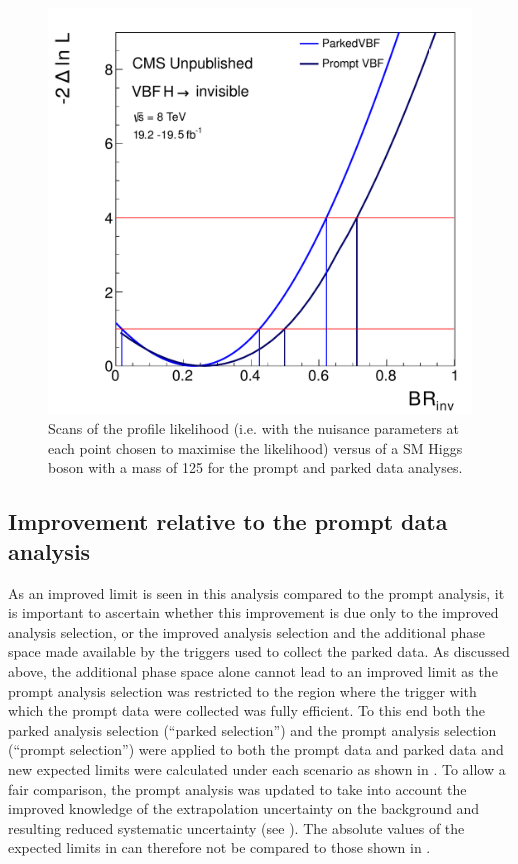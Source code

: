 \begin{figure}
  \includegraphics[width=\largefigwidth]{plots/parked/promptparkedscan.pdf}
  \caption{Scans of the profile likelihood (i.e. with the nuisance parameters at each point chosen to maximise the likelihood) versus \BRinv of a \ac{SM} Higgs boson with a mass of 125 \GeV for the prompt and parked data analyses.}
  \label{fig:parkedlikelihood}
\end{figure}

\subsection{Improvement relative to the prompt data analysis}
As an improved limit is seen in this analysis compared to the prompt analysis, it is important to ascertain whether this improvement is due only to the improved analysis selection, or the improved analysis selection and the additional phase space made available by the triggers used to collect the parked data. As discussed above, the additional phase space alone cannot lead to an improved limit as the prompt analysis selection was restricted to the region where the trigger with which the prompt data were collected was fully efficient. To this end both the parked analysis selection (``parked selection'') and the prompt analysis selection (``prompt selection'') were applied to both the prompt data and parked data and new expected limits were calculated under each scenario as shown in . To allow a fair comparison, the prompt analysis was updated to take into account the improved knowledge of the extrapolation uncertainty on the \Znunu background and resulting reduced systematic uncertainty (see ). The absolute values of the expected limits in  can therefore not be compared to those shown in .

